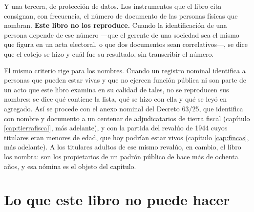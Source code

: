 Y una tercera, de protección de datos. Los instrumentos que el libro cita consignan, con frecuencia, el número de documento de las personas físicas que nombran. \textbf{Este libro no los reproduce.} Cuando la identificación de una persona depende de ese número ---que el gerente de una sociedad sea el mismo que figura en un acta electoral, o que dos documentos sean correlativos---, se dice que el cotejo se hizo y cuál fue su resultado, sin transcribir el número.

El mismo criterio rige para los nombres. Cuando un registro nominal identifica a personas
que pueden estar vivas y que no ejercen función pública ni son parte de un acto que este
libro examina en su calidad de tales, no se reproducen sus nombres: se dice qué contiene la
lista, qué se hizo con ella y qué se leyó en agregado. Así se procede con el anexo nominal
del Decreto 63/25, que identifica con nombre y documento a un centenar de adjudicatarios de
tierra fiscal (capítulo \ref{cap:tierrafiscal}, más adelante), y con la partida del revalúo de 1944 cuyos
titulares eran menores de edad, que hoy podrían estar vivos (capítulo \ref{cap:fincas}, más adelante). A
los titulares adultos de ese mismo revalúo, en cambio, el libro los nombra: son los
propietarios de un padrón público de hace más de ochenta años, y esa nómina es el objeto del
capítulo.

\section{Lo que este libro no puede hacer}

